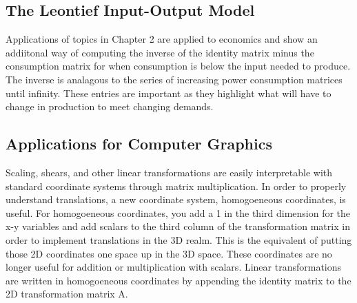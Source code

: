 \documentclass[12pt]{article}
\begin{document}
\subsection{The Leontief Input-Output Model}
Applications of topics in Chapter 2 are applied to economics and show an addiitonal way of computing the inverse of the identity matrix minus the consumption matrix %
for when consumption is below the input needed to produce. The inverse is analagous to the series of increasing power consumption matrices until infinity. These %
entries are important as they highlight what will have to change in production to meet changing demands. 
\subsection{Applications for Computer Graphics}
Scaling, shears, and other linear transformations are easily interpretable with standard coordinate systems through matrix multiplication. In order to properly understand %
translations, a new coordinate system, homogoeneous coordinates, is useful. For homogoeneous coordinates, you add a 1 in the third dimension for the x-y variables and %
add scalars to the third column of the transformation matrix in order to implement %
translations in the 3D realm. This is the equivalent of putting those 2D coordinates one space up in the 3D space. These coordinates are no longer useful for addition or %
multiplication with scalars. Linear transformations are written in homogoeneous coordinates by appending the identity matrix to the 2D transformation matrix A. %
\end{document}
